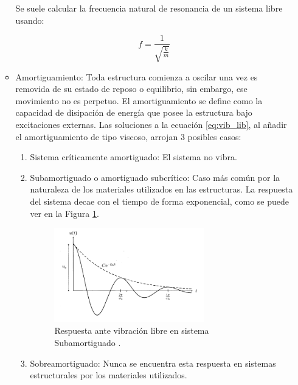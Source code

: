 \begin{itemize}
\begin{itemize}
                Se suele calcular la frecuencia natural de resonancia de un sistema libre usando:

                \begin{equation}
                    f =  \frac{1}{\sqrt{\frac{k}{m}}}
                \end{equation}

            \item Amortiguamiento: Toda estructura comienza a oscilar una vez es removida de su estado de reposo o equilibrio, sin embargo, ese movimiento no es perpetuo. El amortiguamiento se define como la capacidad de disipación de energía que posee la estructura bajo excitaciones externas. Las soluciones a la ecuación \ref{eq:vib_lib}, al añadir el amortiguamiento de tipo viscoso, arrojan 3 posibles casos:
                \begin{enumerate}
                    \item Sistema críticamente amortiguado: El sistema no vibra.
                    \item Subamortiguado o amortiguado subcrítico: Caso más común por la naturaleza de los materiales utilizados en las estructuras. La respuesta del sistema decae con el tiempo de forma exponencial, como se puede ver en la Figura \ref{fig:resp_subamorti}. 
                    
                    \begin{figure}[H]
                        \centering
                        \includegraphics[width = 0.7\textwidth]{imagenes/cap1_marcoteo/respuesta_sist_subamorti.png}
                        \caption{Respuesta ante vibración libre en sistema Subamortiguado \citep{hurtado2000}.}
                        \label{fig:resp_subamorti}
                    \end{figure}

                    \item Sobreamortiguado: Nunca se encuentra esta respuesta en sistemas estructurales por los materiales utilizados.
                \end{enumerate}
            
        \end{itemize}        
\end{itemize}


